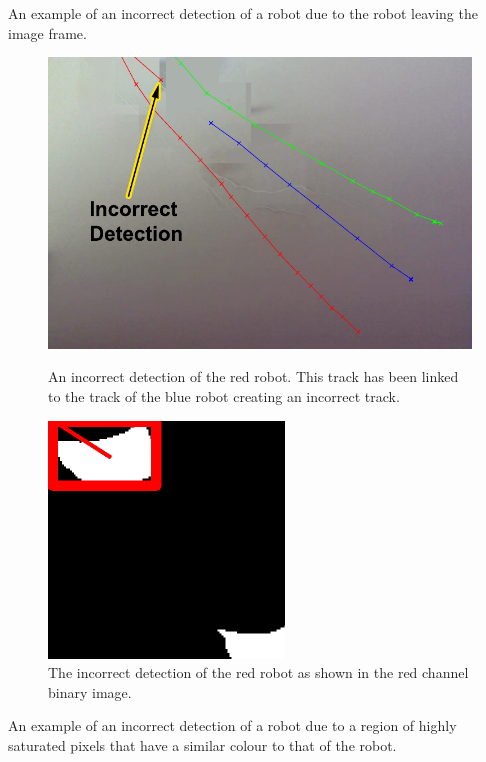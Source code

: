 \documentclass{article}
\begin{document}
An example of an incorrect detection of a robot due to the robot leaving the image frame.
\begin{figure}[h!]
\begin{minipage}[b]{0.5\linewidth}
\includegraphics[scale=0.5]{../Drawings/incorrectdetBackdata1.pdf}
\caption{An incorrect detection of the red robot. This track has been linked to the track of the blue robot creating an incorrect track.}
\label{fig:InDetectData2}
\end{minipage}
\hspace{0.5cm}
\begin{minipage}[b]{0.5\linewidth}
\includegraphics[scale=0.8]{../Drawings/incorrectdetrobotdata1.pdf}
\caption{The incorrect detection of the red robot as shown in the red channel binary image.}
\label{fig:redInDetect}
\end{minipage}
\end{figure}

An example of an incorrect detection of a robot due to a region of highly saturated pixels that have a similar colour to that of the robot.
\end{document}
